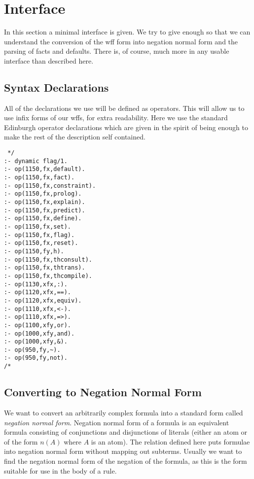 \section{Interface}
In this section a minimal interface is given. We try to give
enough so that we can understand the conversion of the wff form
into negation normal form and
the parsing of facts and defaults. There is, of course,
much more in any usable interface than described here.
\subsection{Syntax Declarations}
All of the declarations we use will be defined as operators.
This will allow us to use infix forms of our wffs, for extra readability.
Here we use the standard Edinburgh operator declarations which are
given in the spirit of being enough to make the rest of the description
self contained.
\begin{verbatim} */
:- dynamic flag/1.
:- op(1150,fx,default).
:- op(1150,fx,fact).
:- op(1150,fx,constraint).
:- op(1150,fx,prolog).
:- op(1150,fx,explain).
:- op(1150,fx,predict).
:- op(1150,fx,define).
:- op(1150,fx,set).
:- op(1150,fx,flag).
:- op(1150,fx,reset).
:- op(1150,fy,h).
:- op(1150,fx,thconsult).
:- op(1150,fx,thtrans).
:- op(1150,fx,thcompile).
:- op(1130,xfx,:).
:- op(1120,xfx,==).
:- op(1120,xfx,equiv).
:- op(1110,xfx,<-).
:- op(1110,xfx,=>).
:- op(1100,xfy,or).
:- op(1000,xfy,and).
:- op(1000,xfy,&).
:- op(950,fy,~).
:- op(950,fy,not).
/* \end{verbatim}


\subsection{Converting to Negation Normal Form} \label{nnf}
We want to convert an arbitrarily complex formula into a standard form
called {\em negation normal form\/}. Negation normal form of a formula is
an equivalent formula consisting of conjunctions and disjunctions of
literals (either an atom or of the form $n(A)$ where $A$ is an atom).
The relation defined here puts formulae into negation normal form
without mapping out subterms.
Usually we want to find the negation normal form of the negation of the
formula, as this is the form suitable for use in the body of a rule.

